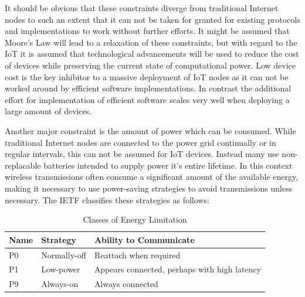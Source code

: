 \documentclass[conference]{IEEEtran}
\begin{document}
It should be obvious that these constraints diverge from traditional Internet nodes to such an extent that it can not be taken for granted for existing protocols and implementations to work without further efforts. It might be assumed that Moore's Law will lead to a relaxation of these constraints, but with regard to the IoT it is assumed that technological advancements will be used to reduce the cost of devices while preserving the current state of computational power. Low device cost is the key inhibitor to a massive  deployment of IoT nodes as it can not be worked around by efficient software implementations. In contrast the additional effort for implementation of efficient software scales very well when deploying a large amount of devices.

Another major constraint is the amount of power which can be consumed. While traditional Internet nodes are connected to the power grid continually or in regular intervals, this can not be assumed for IoT devices. Instead many use non-replacable batteries intended to supply power it's entire lifetime. 
In this context wireless transmissions often consume a significant amount of the available energy, making it necessary to use power-saving strategies to avoid transmissions unless necessary. The IETF classifies these strategies as follows\cite{Ersue}:
\begin{table}[h]
\begin{center}

\begin{tabular}{|l|l|l|}
\hline
\textbf{Name} & \textbf{Strategy}                                                                                                                    & \textbf{Ability to Communicate}              \\ \hline
P0            & Normally-off                              & Reattach when required                       \\
P1            & Low-power                                                                                                                            & Appears connected, perhaps with high latency \\
P9            & Always-on                                                                                                                            & Always connected                             \\ \hline
\end{tabular}
\label{table:device-classes-power}
\caption{Classes of Energy Limitation\cite{Ersue}}
\end{center}

\end{table} 
\end{document}
